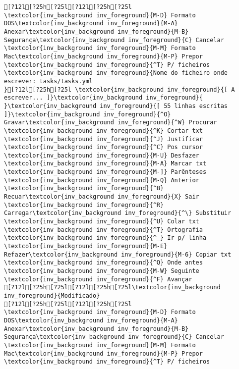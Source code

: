 \documentclass{scrartcl}
\begin{document}
\begin{Verbatim}
[?12l[?25h[?25l[?12l[?25h[?25l                      \textcolor{inv_background inv_foreground}{M-D} Formato DOS\textcolor{inv_background inv_foreground}{M-A} Anexar\textcolor{inv_background inv_foreground}{M-B} Segurança\textcolor{inv_background inv_foreground}{C} Cancelar                        \textcolor{inv_background inv_foreground}{M-M} Formato Mac\textcolor{inv_background inv_foreground}{M-P} Prepor         \textcolor{inv_background inv_foreground}{^T} P/ ficheiros
\textcolor{inv_background inv_foreground}{Nome do ficheiro onde escrever: tasks/tasks.yml                                                                                                                                              }[?12l[?25h[?25l \textcolor{inv_background inv_foreground}{[ A escrever... ]}\textcolor{inv_background inv_foreground}{          }\textcolor{inv_background inv_foreground}{[ 55 linhas escritas ]}\textcolor{inv_background inv_foreground}{^O} Gravar\textcolor{inv_background inv_foreground}{^W} Procurar      \textcolor{inv_background inv_foreground}{^K} Cortar txt    \textcolor{inv_background inv_foreground}{^J} Justificar    \textcolor{inv_background inv_foreground}{^C} Pos cursor    \textcolor{inv_background inv_foreground}{M-U} Desfazer     \textcolor{inv_background inv_foreground}{M-A} Marcar txt   \textcolor{inv_background inv_foreground}{M-]} Parênteses   \textcolor{inv_background inv_foreground}{M-Q} Anterior     \textcolor{inv_background inv_foreground}{^B} Recuar\textcolor{inv_background inv_foreground}{X} Sair    \textcolor{inv_background inv_foreground}{^R} Carregar\textcolor{inv_background inv_foreground}{^\} Substituir    \textcolor{inv_background inv_foreground}{^U} Colar txt     \textcolor{inv_background inv_foreground}{^T} Ortografia    \textcolor{inv_background inv_foreground}{^_} Ir p/ linha   \textcolor{inv_background inv_foreground}{M-E} Refazer\textcolor{inv_background inv_foreground}{M-6} Copiar txt   \textcolor{inv_background inv_foreground}{^Q} Onde antes    \textcolor{inv_background inv_foreground}{M-W} Seguinte     \textcolor{inv_background inv_foreground}{^F} Avançar
[?12l[?25h[?25l[?12l[?25h[?25l\textcolor{inv_background inv_foreground}{Modificado}
[?12l[?25h[?25l[?12l[?25h[?25l                      \textcolor{inv_background inv_foreground}{M-D} Formato DOS\textcolor{inv_background inv_foreground}{M-A} Anexar\textcolor{inv_background inv_foreground}{M-B} Segurança\textcolor{inv_background inv_foreground}{C} Cancelar                        \textcolor{inv_background inv_foreground}{M-M} Formato Mac\textcolor{inv_background inv_foreground}{M-P} Prepor         \textcolor{inv_background inv_foreground}{^T} P/ ficheiros

\end{Verbatim}
\end{document}
